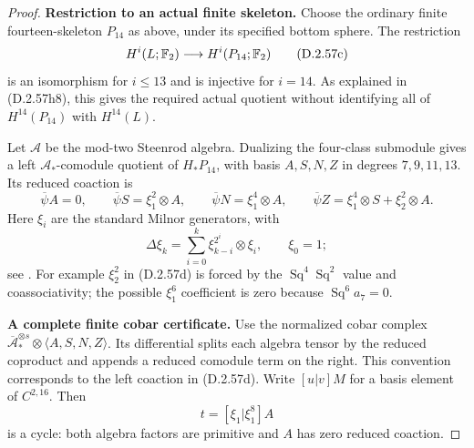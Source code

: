 \begin{proof}


\medskip\noindent
\textbf{Restriction to an actual finite skeleton.}
Choose the ordinary finite fourteen-skeleton $P_{14}$
as above, under its specified bottom sphere.  The restriction
\[
 H^i(L;\mathbb F_2)\longrightarrow H^i(P_{14};\mathbb F_2)
 \tag{D.2.57c}
\]
is an isomorphism for $i\le13$ and is injective for
$i=14$.  As explained in \textup{(D.2.57h8)}, this
gives the required actual quotient without identifying
all of $H^{14}(P_{14})$ with $H^{14}(L)$.

Let $\mathcal A$ be the mod-two Steenrod algebra.
Dualizing the four-class submodule gives a left
$\mathcal A_*$-comodule quotient of $H_*P_{14}$,
with basis $A,S,N,Z$ in degrees $7,9,11,13$.
Its reduced coaction is
\[
 \overline\psi A=0,\qquad
 \overline\psi S=\xi_1^2\otimes A,\qquad
 \overline\psi N=\xi_1^4\otimes A,\qquad
 \overline\psi Z=\xi_1^4\otimes S+\xi_2^2\otimes A.
 \tag{D.2.57d}
\]
Here $\xi_i$ are the standard Milnor generators, with
\[
 \Delta\xi_k=\sum_{i=0}^k\xi_{k-i}^{2^i}\otimes\xi_i,
                 \qquad\xi_0=1;
 \tag{D.2.57e}
\]
see \cite[Theorem 3, p.~162, and Appendix 1, p.~171]
{EH5Milnor1958Steenrod}.
For example $\xi_2^2$ in \textup{(D.2.57d)} is
forced by the $\operatorname{Sq}^4\operatorname{Sq}^2$
value and coassociativity; the possible $\xi_1^6$
coefficient is zero because $\operatorname{Sq}^6a_7=0$.

\medskip\noindent
\textbf{A complete finite cobar certificate.}
Use the normalized cobar complex
$\overline{\mathcal A}_*^{\otimes s}\otimes
\langle A,S,N,Z\rangle$.  Its differential splits
each algebra tensor by the reduced coproduct and
appends a reduced comodule term on the right.
This convention corresponds to the left coaction in
\textup{(D.2.57d)}.  Write $[u|v]M$ for a basis
element of $C^{2,16}$.  Then
\[
                         t=[\xi_1|\xi_1^8]A
                         \tag{D.2.57f}
\]
is a cycle: both algebra factors are primitive and
$A$ has zero reduced coaction.


\end{proof}
